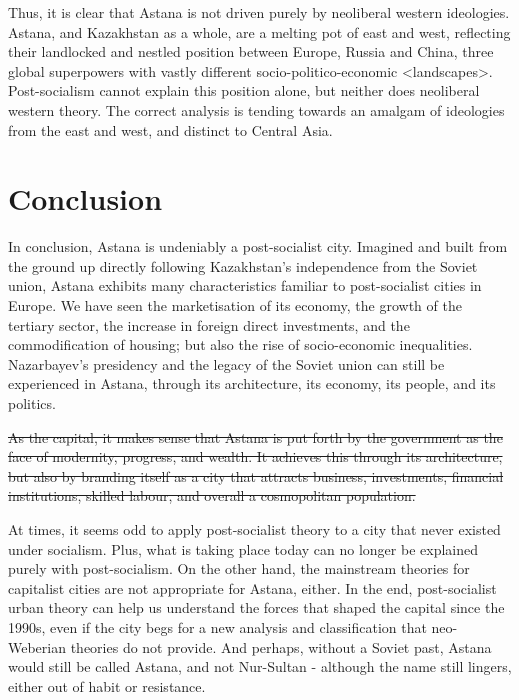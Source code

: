 \documentclass{article}
\begin{document}
Thus, it is clear that Astana is not driven purely by neoliberal western ideologies. Astana, and Kazakhstan as a whole, are a melting pot of east and west, reflecting their landlocked and nestled position between Europe, Russia and China, three global superpowers with vastly different socio-politico-economic <landscapes>. Post-socialism cannot explain this position alone, but neither does neoliberal western theory. The correct analysis is tending towards an amalgam of ideologies from the east and west, and distinct to Central Asia.

\section{Conclusion}

In conclusion, Astana is undeniably a post-socialist city. Imagined and built from the ground up directly following Kazakhstan's independence from the Soviet union, Astana exhibits many characteristics familiar to post-socialist cities in Europe. We have seen the marketisation of its economy, the growth of the tertiary sector, the increase in foreign direct investments, and the commodification of housing; but also the rise of socio-economic inequalities. Nazarbayev's presidency and the legacy of the Soviet union can still be experienced in Astana, through its architecture, its economy, its people, and its politics.

\sout{As the capital, it makes sense that Astana is put forth by the government as the face of modernity, progress, and wealth. It achieves this through its architecture, but also by branding itself as a city that attracts business, investments, financial institutions, skilled labour, and overall a cosmopolitan population.}

At times, it seems odd to apply post-socialist theory to a city that never existed under socialism. Plus, what is taking place today can no longer be explained purely with post-socialism. On the other hand, the mainstream theories for capitalist cities are not appropriate for Astana, either.
In the end, post-socialist urban theory can help us understand the forces that shaped the capital since the 1990s, even if the city begs for a new analysis and classification that neo-Weberian theories do not provide.
And perhaps, without a Soviet past, Astana would still be called Astana, and not Nur-Sultan - although the name still lingers, either out of habit or resistance.

\pagebreak

\printbibliography
\end{document}
